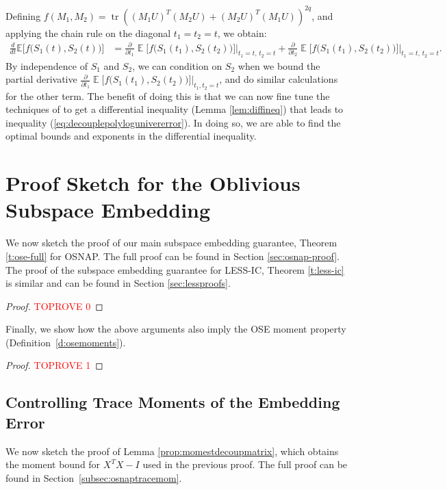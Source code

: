\documentclass[11pt]{amsart}
\numberwithin{equation}{section}
\numberwithin{equation}{section}
\DeclareMathOperator{\E}{\mathbb{E}}
\DeclareMathOperator*{\tr}{tr}
\theoremstyle{remark}
\theoremstyle{definition}
\begin{document}
Defining $f(M_1,M_2)=\tr((M_1U)^T(M_2U)+(M_2U)^T(M_1U))^{2q}$, and applying the chain rule on the diagonal $t_1=t_2=t$, we obtain:
\begin{align*}
\frac{d}{dt} \mathbb{E}\bigl[f\bigl(S_1(t),S_2(t)\bigr)\bigr]
&=\frac{\partial}{\partial t_1}\E\bigl[ f\bigl(S_1(t_1),S_2(t_2)\bigr)\bigr]\Big|_{t_1=t,\,t_2=t}
+\frac{\partial}{\partial t_2}\E\bigl[ f\bigl(S_1(t_1),S_2(t_2)\bigr)\bigr]\Big|_{t_1=t,\,t_2=t}.
\end{align*}
By independence of $S_1$ and $S_2$, we can condition on $S_2$ when we bound the partial derivative $\frac{\partial}{\partial t_1}\E\bigl[f\bigl(S_1(t_1),S_2(t_2)\bigr)\bigr]\big|_{t_1, t_2=t}$, and do similar calculations for the other term. The benefit of doing this is that we can now fine tune the techniques of \cite{brailovskaya2022universality} to get a differential inequality (Lemma \ref{lem:diffineq}) that leads to inequality (\ref{eq:decouplepolylogunivererror}). In doing so, we are able to find the optimal bounds and exponents in the differential inequality.  

\section{Proof Sketch for the Oblivious Subspace Embedding} \label{sec:proofsketch}

We now sketch the proof of our main subspace embedding guarantee, Theorem \ref{t:ose-full} for OSNAP. The full proof can be found in Section \ref{sec:osnap-proof}. The proof of the subspace embedding guarantee for LESS-IC, Theorem \ref{t:less-ic} is similar and can be found in Section \ref{sec:lessproofs}.

\begin{proof}\textcolor{red}{TOPROVE 0}\end{proof}
Finally, we show how the above arguments also imply the OSE moment property (Definition~\ref{d:osemoments}).
\begin{proof}\textcolor{red}{TOPROVE 1}\end{proof}


\subsection{Controlling Trace Moments of the Embedding Error}

We now sketch the proof of Lemma \ref{prop:momestdecoupmatrix}, which obtains the moment bound for $X^TX-I$ used in the previous proof. The full proof can be found in Section~\ref{subsec:osnaptracemom}. 
\end{document}
